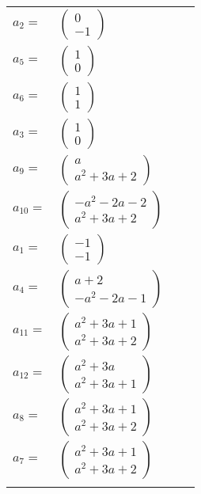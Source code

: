 \documentclass[1p]{elsarticle_modified}
\theoremstyle{definition}
\begin{document}
\begin{tabular}{m{7pt} m{180pt} m{7pt} m{180pt} }
\flushright $a_{2}=$&$\begin{pmatrix}0\\-1\end{pmatrix}$ \\
\flushright $a_{5}=$&$\begin{pmatrix}1\\0\end{pmatrix}$ \\
\flushright $a_{6}=$&$\begin{pmatrix}1\\1\end{pmatrix}$ \\
\flushright $a_{3}=$&$\begin{pmatrix}1\\0\end{pmatrix}$ \\
\flushright $a_{9}=$&$\begin{pmatrix}a\\a^2+3 a+2\end{pmatrix}$ \\
\flushright $a_{10}=$&$\begin{pmatrix}- a^2-2 a-2\\a^2+3 a+2\end{pmatrix}$ \\
\flushright $a_{1}=$&$\begin{pmatrix}-1\\-1\end{pmatrix}$ \\
\flushright $a_{4}=$&$\begin{pmatrix}a+2\\- a^2-2 a-1\end{pmatrix}$ \\
\flushright $a_{11}=$&$\begin{pmatrix}a^2+3 a+1\\a^2+3 a+2\end{pmatrix}$ \\
\flushright $a_{12}=$&$\begin{pmatrix}a^2+3 a\\a^2+3 a+1\end{pmatrix}$ \\
\flushright $a_{8}=$&$\begin{pmatrix}a^2+3 a+1\\a^2+3 a+2\end{pmatrix}$ \\
\flushright $a_{7}=$&$\begin{pmatrix}a^2+3 a+1\\a^2+3 a+2\end{pmatrix}$\\&\end{tabular}
\end{document}

